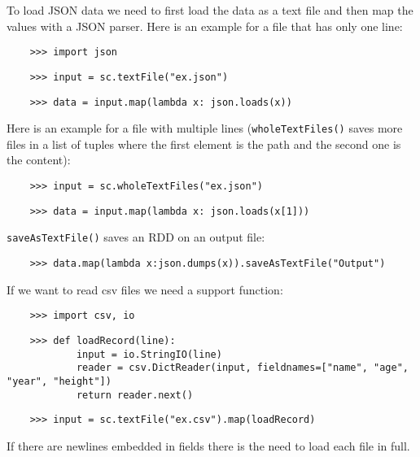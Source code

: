 To load JSON data we need to first load the data as a text file and then map the values with a JSON parser. Here is an example for a file that has only one line:

\begin{lstlisting}
    >>> import json
\end{lstlisting}

\begin{lstlisting}
    >>> input = sc.textFile("ex.json")
\end{lstlisting}

\begin{lstlisting}
    >>> data = input.map(lambda x: json.loads(x))
\end{lstlisting}

Here is an example for a file with multiple lines (\texttt{wholeTextFiles()} saves more files in a list of tuples where the first element is the path and the second one is the content):

\begin{lstlisting}
    >>> input = sc.wholeTextFiles("ex.json")
\end{lstlisting}

\begin{lstlisting}
    >>> data = input.map(lambda x: json.loads(x[1]))
\end{lstlisting}

\texttt{saveAsTextFile()} saves an RDD on an output file:

\begin{lstlisting}
    >>> data.map(lambda x:json.dumps(x)).saveAsTextFile("Output")
\end{lstlisting}


If we want to read csv files we need a support function:

\begin{lstlisting}
    >>> import csv, io
\end{lstlisting}

\begin{lstlisting}
    >>> def loadRecord(line):
            input = io.StringIO(line)
            reader = csv.DictReader(input, fieldnames=["name", "age", "year", "height"])
            return reader.next()
\end{lstlisting}

\begin{lstlisting}
    >>> input = sc.textFile("ex.csv").map(loadRecord)
\end{lstlisting}

If there are newlines embedded in fields there is the need to load each file in full.
